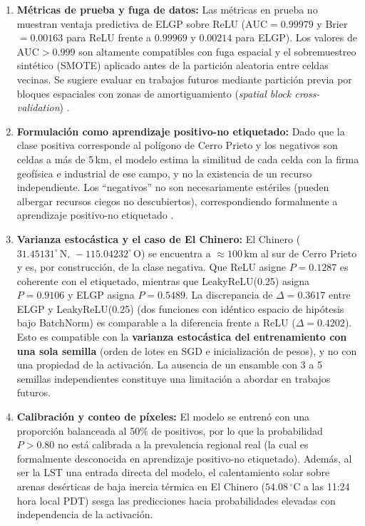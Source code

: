 \documentclass[10pt,twocolumn,letterpaper]{article}
\newcommand{\AUC}{\mathrm{AUC}}
\begin{document}
\begin{enumerate}[leftmargin=1.2em]
  \item \textbf{Métricas de prueba y fuga de datos:} Las métricas en prueba no muestran ventaja predictiva de ELGP sobre ReLU ($\AUC = 0.99979$ y Brier $= 0.00163$ para ReLU frente a $0.99969$ y $0.00214$ para ELGP). Los valores de $\AUC > 0.999$ son altamente compatibles con fuga espacial y el sobremuestreo sintético (SMOTE) \citep{chawla2002smote} aplicado antes de la partición aleatoria entre celdas vecinas. Se sugiere evaluar en trabajos futuros mediante partición previa por bloques espaciales con zonas de amortiguamiento (\emph{spatial block cross-validation}) \citep{roberts2017crossval}.
  \item \textbf{Formulación como aprendizaje positivo-no etiquetado:} Dado que la clase positiva corresponde al polígono de Cerro Prieto y los negativos son celdas a más de 5\,km, el modelo estima la similitud de cada celda con la firma geofísica e industrial de ese campo, y no la existencia de un recurso independiente. Los ``negativos'' no son necesariamente estériles (pueden albergar recursos ciegos no descubiertos), correspondiendo formalmente a aprendizaje positivo-no etiquetado \citep{elkan2008pu}.
  \item \textbf{Varianza estocástica y el caso de El Chinero:} El Chinero ($31.45131^\circ\,\text{N},\,-115.04232^\circ\,\text{O}$) se encuentra a $\approx 100\,\text{km}$ al sur de Cerro Prieto y es, por construcción, de la clase negativa. Que ReLU asigne $P = 0.1287$ es coherente con el etiquetado, mientras que LeakyReLU(0.25) asigna $P = 0.9106$ y ELGP asigna $P = 0.5489$. La discrepancia de $\Delta = 0.3617$ entre ELGP y LeakyReLU(0.25) (dos funciones con idéntico espacio de hipótesis bajo BatchNorm) es comparable a la diferencia frente a ReLU ($\Delta = 0.4202$). Esto es compatible con la \textbf{varianza estocástica del entrenamiento con una sola semilla} (orden de lotes en SGD e inicialización de pesos), y no con una propiedad de la activación. La ausencia de un ensamble con 3 a 5 semillas independientes constituye una limitación a abordar en trabajos futuros.
  \item \textbf{Calibración y conteo de píxeles:} El modelo se entrenó con una proporción balanceada al 50\% de positivos, por lo que la probabilidad $P > 0.80$ no está calibrada a la prevalencia regional real (la cual es formalmente desconocida en aprendizaje positivo-no etiquetado). Además, al ser la LST una entrada directa del modelo, el calentamiento solar sobre arenas desérticas de baja inercia térmica en El Chinero ($54.08\,^\circ\text{C}$ a las 11:24 hora local PDT) sesga las predicciones hacia probabilidades elevadas con independencia de la activación.
\end{enumerate}
\end{document}
